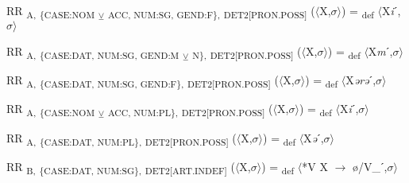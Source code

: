 {\begin{exe}
 RR \textsubscript{A,} \textsubscript{\{CASE:NOM} \textsubscript{${\veebar}$}\textsubscript{ ACC, NUM:SG, GEND:F\},} \textsubscript{DET2[PRON.POSS]} ($\langle$X,$\sigma $$\rangle$) = \textsubscript{def} $\langle$X\textit{i}ˊ,$\sigma $$\rangle$
\end{exe}

\begin{exe}
 RR \textsubscript{A,} \textsubscript{\{CASE:DAT, NUM:SG, GEND:M} \textsubscript{${\veebar}$}\textsubscript{ N\},} \textsubscript{DET2[PRON.POSS]} ($\langle$X,$\sigma $$\rangle$) = \textsubscript{def} $\langle$X\textit{m}ˊ,$\sigma $$\rangle$
\end{exe}

\begin{exe}
 RR \textsubscript{A,} \textsubscript{\{CASE:DAT, NUM:SG, GEND:F\},} \textsubscript{DET2[PRON.POSS]} ($\langle$X,$\sigma $$\rangle$) = \textsubscript{def} $\langle$X\textit{ərə}ˊ,$\sigma $$\rangle$
\end{exe}

\begin{exe}
 RR \textsubscript{A,} \textsubscript{\{CASE:NOM} \textsubscript{${\veebar}$}\textsubscript{ ACC, NUM:PL\},} \textsubscript{DET2[PRON.POSS]} ($\langle$X,$\sigma $$\rangle$) = \textsubscript{def} $\langle$X\textit{i}ˊ,$\sigma $$\rangle$
\end{exe}

\begin{exe}
 RR \textsubscript{A,} \textsubscript{\{CASE:DAT, NUM:PL\},} \textsubscript{DET2[PRON.POSS]} ($\langle$X,$\sigma $$\rangle$) = \textsubscript{def} $\langle$X\textit{ə}ˊ,$\sigma $$\rangle$
\end{exe}

\begin{exe}
 RR \textsubscript{B,} \textsubscript{\{CASE:DAT, NUM:SG\},} \textsubscript{DET2[ART.INDEF]} ($\langle$X,$\sigma $$\rangle$) = \textsubscript{def} $\langle$*V X $\rightarrow$ ø/V\_ˊ,$\sigma $$\rangle$
\end{exe}
}
